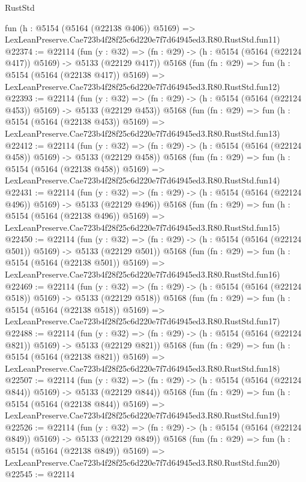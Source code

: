 \begin{lexlean}{RustStd}
\begin{coremodule}
    fun (h : @5154 (@5164 (@22138 @406)) @5169) =>
    LexLeanPreserve.Cae723b4f28f25c6d220e7f7d64945ed3.R80.RustStd.fun11)
@22374 := @22114
    (fun (y : @32) => (fn : @29) -> (h : @5154 (@5164 (@22124 @417)) @5169) -> @5133 (@22129 @417))
    @5168
    (fun (fn : @29) =>
    fun (h : @5154 (@5164 (@22138 @417)) @5169) =>
    LexLeanPreserve.Cae723b4f28f25c6d220e7f7d64945ed3.R80.RustStd.fun12)
@22393 := @22114
    (fun (y : @32) => (fn : @29) -> (h : @5154 (@5164 (@22124 @453)) @5169) -> @5133 (@22129 @453))
    @5168
    (fun (fn : @29) =>
    fun (h : @5154 (@5164 (@22138 @453)) @5169) =>
    LexLeanPreserve.Cae723b4f28f25c6d220e7f7d64945ed3.R80.RustStd.fun13)
@22412 := @22114
    (fun (y : @32) => (fn : @29) -> (h : @5154 (@5164 (@22124 @458)) @5169) -> @5133 (@22129 @458))
    @5168
    (fun (fn : @29) =>
    fun (h : @5154 (@5164 (@22138 @458)) @5169) =>
    LexLeanPreserve.Cae723b4f28f25c6d220e7f7d64945ed3.R80.RustStd.fun14)
@22431 := @22114
    (fun (y : @32) => (fn : @29) -> (h : @5154 (@5164 (@22124 @496)) @5169) -> @5133 (@22129 @496))
    @5168
    (fun (fn : @29) =>
    fun (h : @5154 (@5164 (@22138 @496)) @5169) =>
    LexLeanPreserve.Cae723b4f28f25c6d220e7f7d64945ed3.R80.RustStd.fun15)
@22450 := @22114
    (fun (y : @32) => (fn : @29) -> (h : @5154 (@5164 (@22124 @501)) @5169) -> @5133 (@22129 @501))
    @5168
    (fun (fn : @29) =>
    fun (h : @5154 (@5164 (@22138 @501)) @5169) =>
    LexLeanPreserve.Cae723b4f28f25c6d220e7f7d64945ed3.R80.RustStd.fun16)
@22469 := @22114
    (fun (y : @32) => (fn : @29) -> (h : @5154 (@5164 (@22124 @518)) @5169) -> @5133 (@22129 @518))
    @5168
    (fun (fn : @29) =>
    fun (h : @5154 (@5164 (@22138 @518)) @5169) =>
    LexLeanPreserve.Cae723b4f28f25c6d220e7f7d64945ed3.R80.RustStd.fun17)
@22488 := @22114
    (fun (y : @32) => (fn : @29) -> (h : @5154 (@5164 (@22124 @821)) @5169) -> @5133 (@22129 @821))
    @5168
    (fun (fn : @29) =>
    fun (h : @5154 (@5164 (@22138 @821)) @5169) =>
    LexLeanPreserve.Cae723b4f28f25c6d220e7f7d64945ed3.R80.RustStd.fun18)
@22507 := @22114
    (fun (y : @32) => (fn : @29) -> (h : @5154 (@5164 (@22124 @844)) @5169) -> @5133 (@22129 @844))
    @5168
    (fun (fn : @29) =>
    fun (h : @5154 (@5164 (@22138 @844)) @5169) =>
    LexLeanPreserve.Cae723b4f28f25c6d220e7f7d64945ed3.R80.RustStd.fun19)
@22526 := @22114
    (fun (y : @32) => (fn : @29) -> (h : @5154 (@5164 (@22124 @849)) @5169) -> @5133 (@22129 @849))
    @5168
    (fun (fn : @29) =>
    fun (h : @5154 (@5164 (@22138 @849)) @5169) =>
    LexLeanPreserve.Cae723b4f28f25c6d220e7f7d64945ed3.R80.RustStd.fun20)
@22545 := @22114

\end{coremodule}
\end{lexlean}

